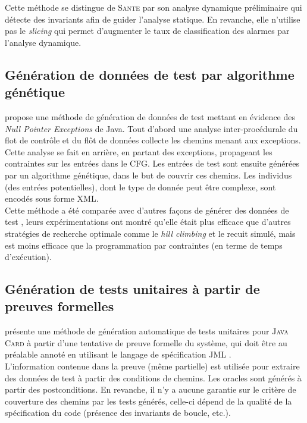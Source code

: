 Cette méthode se distingue de \textsc{Sante} \cite{SANTE} par son analyse
dynamique préliminaire qui détecte des invariants afin de guider l'analyse
statique. En revanche, elle n'utilise pas le {\em slicing} qui permet
d'augmenter le taux de classification des alarmes par l'analyse dynamique.

\subsection{Génération de données de test par algorithme génétique}

\cite{search-based-testing-of-NPE} propose une méthode de génération de données
de test mettant en évidence des {\em Null Pointer Exceptions} de Java. Tout
d'abord une analyse inter-procédurale du flot de contrôle et du flôt de données
collecte les chemins menant aux exceptions. Cette analyse se fait en arrière, en
partant des exceptions, propageant les contraintes sur les entrées dans le CFG.
Les entrées de test sont ensuite générées par un algorithme génétique, dans le
but de couvrir ces chemins. Les individus (des entrées potentielles), dont le
type de donnée peut être complexe, sont encodés sous forme XML.\\

Cette méthode a été comparée avec d'autres façons de générer des données de
test \cite{DbZ-exception-raising-via-branch-coverage}, leurs expérimentations
ont montré qu'elle était plus efficace que d'autres stratégies de recherche
optimale comme le {\em hill climbing} et le recuit simulé, mais est moins
efficace que la programmation par contraintes (en terme de temps d'exécution). 

\subsection{Génération de tests unitaires à partir de preuves formelles}

\cite{generating-unit-tests-from-formal-proofs} présente une méthode de
génération automatique de tests unitaires pour \textsc{Java Card} à partir d'une
tentative de preuve formelle du système, qui doit être au préalable annoté en
utilisant le langage de spécification \textsc{JML} \cite{JML}.\\

L'information contenue dans la preuve (même partielle) est utilisée
pour extraire des données de test à partir des conditions de chemins. Les
oracles sont générés à partir des postconditions. En revanche, il n'y a aucune
garantie sur le critère de couverture des chemins par les tests générés,
celle-ci dépend de la qualité de la spécification du code (présence des
invariants de boucle, etc.).


